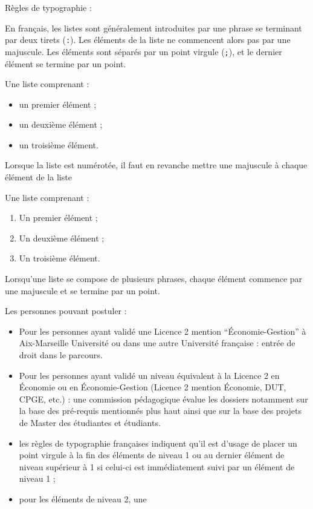 \documentclass[
  11pt,
]{book}
\providecommand{\tightlist}{%
  \setlength{\itemsep}{0pt}\setlength{\parskip}{0pt}}
\numberwithin{equation}{section}
\numberwithin{countremarque}{section}
\newenvironment{notebox}{
  \begin{tcolorbox}[breakable, colback=jaune,coltext=black,
                  colframe=grisfonce]}
 {\end{tcolorbox}}
\begin{document}
\begin{notebox}

Règles de typographie :

En français, les listes sont généralement introduites par une phrase se terminant par deux tirets (\texttt{:}). Les éléments de la liste ne commencent alors pas par une majuscule. Les éléments sont séparés par un point virgule (\texttt{;}), et le dernier élément se termine par un point.

Une liste comprenant :

\begin{itemize}
\tightlist
\item
  un premier élément ;
\item
  un deuxième élément ;
\item
  un troisième élément.
\end{itemize}

Lorsque la liste est numérotée, il faut en revanche mettre une majuscule à chaque élément de la liste

Une liste comprenant :

\begin{enumerate}
\def\labelenumi{\arabic{enumi}.}
\tightlist
\item
  Un premier élément ;
\item
  Un deuxième élément ;
\item
  Un troisième élément.
\end{enumerate}

Lorsqu'une liste se compose de plusieurs phrases, chaque élément commence par une majuscule et se termine par un point.

Les personnes pouvant postuler :

\begin{itemize}
\item
  Pour les personnes ayant validé une Licence 2 mention ``Économie-Gestion'' à Aix-Marseille Université ou dans une autre Université française : entrée de droit dans le parcours.
\item
  Pour les personnes ayant validé un niveau équivalent à la Licence 2 en Économie ou en Économie-Gestion (Licence 2 mention Économie, DUT, CPGE, etc.) : une commission pédagogique évalue les dossiers notamment sur la base des pré-requis mentionnés plus haut ainsi que sur la base des projets de Master des étudiantes et étudiants.
\item
  les règles de typographie françaises indiquent qu'il est d'usage de placer un point virgule à la fin des éléments de niveau 1 ou au dernier élément de niveau supérieur à 1 si celui-ci est immédiatement suivi par un élément de niveau 1 ;
\item
  pour les éléments de niveau 2, une
\end{itemize}


\end{notebox}
\end{document}

